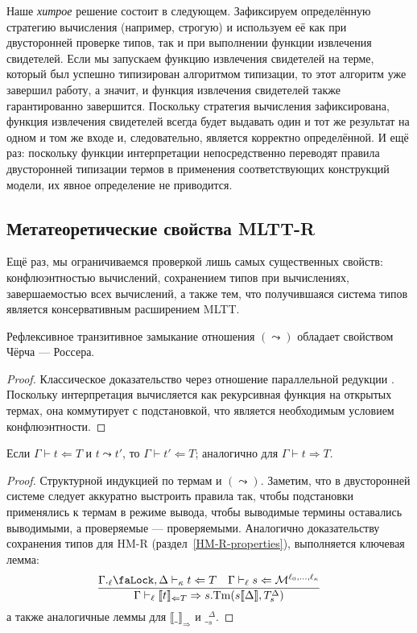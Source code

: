 Наше \emph{хитрое} решение состоит в следующем.
Зафиксируем определённую стратегию вычисления
(например, строгую) и используем её как при
двусторонней проверке типов, так и при выполнении
функции извлечения свидетелей. Если мы запускаем
функцию извлечения свидетелей на терме, который был
успешно типизирован алгоритмом типизации, то этот
алгоритм уже завершил работу, а значит, и функция
извлечения свидетелей также гарантированно завершится.
Поскольку стратегия вычисления зафиксирована, функция
извлечения свидетелей всегда будет выдавать один и тот
же результат на одном и том же входе и, следовательно,
является корректно определённой. И ещё раз: поскольку
функции интерпретации непосредственно переводят правила
двусторонней типизации термов в применения
соответствующих конструкций модели, их явное
определение не приводится.

\subsection{Метатеоретические свойства MLTT-R}
\label{MLTT-R-properties}

Ещё раз, мы ограничиваемся проверкой лишь самых
существенных свойств: конфлюэнтностью вычислений,
сохранением типов при вычислениях, завершаемостью всех
вычислений, а также тем, что получившаяся система типов
является консервативным расширением MLTT.

\begin{theorem}
    Рефлексивное транзитивное замыкание отношения
    $(\leadsto)$ обладает свойством Чёрча --- Россера.
\end{theorem}
\begin{proof}
    Классическое доказательство через отношение
    параллельной редукции \cite{CRproof}. Поскольку
    интерпретация вычисляется как рекурсивная функция
    на открытых термах, она коммутирует с подстановкой,
    что является необходимым условием конфлюэнтности.
\end{proof}

\begin{theorem}
    Если $\Gamma\vdash t\Leftarrow T$ и $t\leadsto t'$,
    то $\Gamma\vdash t'\Leftarrow T$; аналогично для
    $\Gamma\vdash t\Rightarrow T$.
\end{theorem}
\begin{proof}
    Структурной индукцией по термам и $(\leadsto)$.
    Заметим, что в двусторонней системе следует
    аккуратно выстроить правила так, чтобы подстановки
    применялись к термам в режиме вывода, чтобы
    выводимые термины оставались выводимыми, а
    проверяемые --- проверяемыми.
    Аналогично доказательству сохранения типов для
    HM-R (раздел~\ref{HM-R-properties}), выполняется
    ключевая лемма:
    \[  \dfrac{
        \Gamma.{}_\ell\text{\faLock},\Delta
        \vdash_\kappa t\Leftarrow T
        \quad\Gamma\vdash_\ell s\Leftarrow
        \mathcal{M}^{\ell_0,\ldots,\ell_\kappa}
    }{\Gamma\vdash_\ell\llbracket t\rrbracket_{
            \Leftarrow T}\Rightarrow
        s.\mathrm{Tm}(s\llbracket\Delta\rrbracket,
        T_s^\Delta)}
    \]
    а также аналогичные леммы для
    $\llbracket\_ \rrbracket_\Rightarrow$ и
    $\__s^\Delta$.
\end{proof}

